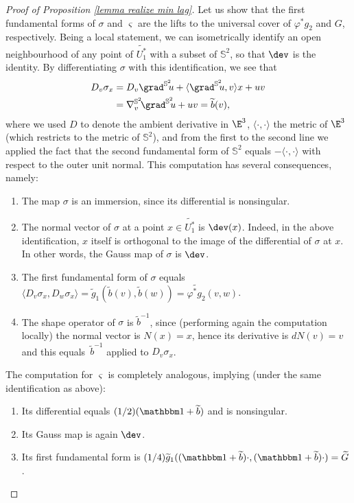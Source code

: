 \begin{proof}[Proof of Proposition \ref{lemma realize min lag}]
\step\label{step:1}
Let us show that the first fundamental forms of $\sigma$ and $ \varsigma$ are the lifts to the universal cover of $\varphi^*g_2$ and $G$, respectively.
Being a local statement, we can isometrically identify an open neighbourhood of any point of $\widetilde {U_1^*}$ with a subset of $\mathbb S^2$, so that $\dev$ is the identity. By differentiating $\sigma$ with this identification, we see that
\begin{align*}
D_v \sigma_x&=D_v\grad^{\mathbb S^2}\!\! u+\langle \grad^{\mathbb S^2}\!\!u,v\rangle x+uv \\
&=\nabla^{\mathbb S^2}_v\!\grad^{\mathbb S^2}\!\! u+uv=\widetilde b(v),
\end{align*}
where we used $D$ to denote the ambient derivative in $\E^3$, $\langle\cdot,\cdot\rangle$ the metric of $\E^3$ (which restricts to the metric of $\mathbb S^2$), and from the first to the second line we applied the fact that the second fundamental form of $\mathbb S^2$ equals $-\langle\cdot,\cdot\rangle$ with respect to the outer unit normal. This computation has several consequences, namely:
\begin{enumerate}
\item\label{enum:1} The map $ \sigma$ is an immersion, since its differential is nonsingular.
\item\label{enum:2} The normal vector of $ \sigma$ at a point $x\in \widetilde{U_1^*}$ is $\dev(x)$. Indeed, in the above identification, $x$ itself is orthogonal to the image of the differential of $\sigma$ at $x$. In other words, the Gauss map of $ \sigma$ is $\dev$.
\item\label{enum:3} The first fundamental form of $ \sigma$ equals
$\langle D_v\sigma_x,D_w\sigma_x\rangle=\widetilde g_1( \widetilde b(v),\widetilde b(w))=\widetilde{\varphi^*g_2}(v,w)$.
\item\label{enum:4} The shape operator of $ \sigma$ is $\widetilde b^{-1}$, since (performing again the computation local\-ly) the normal vector is $N(x)=x$, hence its derivative is $dN(v)=v$ and this equals~$\widetilde b^{-1}$ applied to $D_v\sigma_x$.
\end{enumerate}
The computation for $\varsigma$ is completely analogous, implying (under the same identification as above):
\begin{enumerate}\renewcommand{\theenumi}{\arabic{enumi}$'$}
\item\label{enum:1'}
Its differential equals $(1/2)(\mathbbm 1+\widetilde b)$ and is nonsingular.
\item\label{enum:2'}
Its Gauss map is again $\dev$.
\item\label{enum:3'}
Its first fundamental form is $(1/4)\widetilde g_1((\mathbbm 1+ \widetilde b)\cdot,(\mathbbm 1+ \widetilde b)\cdot)=\widetilde G$.
\end{enumerate}


\end{proof}

